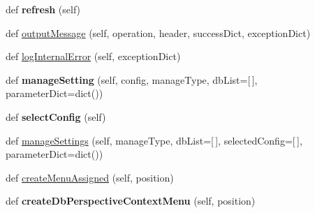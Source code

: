 \begin{DoxyCompactItemize}
def {\bfseries refresh} (self)
\item 
def \mbox{\hyperlink{class_dsg_tools_1_1_custom_widgets_1_1generic_manager_widget_1_1_generic_manager_widget_aef0d68dae266dd315aa07d964476108d}{output\+Message}} (self, operation, header, success\+Dict, exception\+Dict)
\item 
def \mbox{\hyperlink{class_dsg_tools_1_1_custom_widgets_1_1generic_manager_widget_1_1_generic_manager_widget_ae81b2d9956598304c8bf9e2a47e71a23}{log\+Internal\+Error}} (self, exception\+Dict)
\item 
\mbox{\label{class_dsg_tools_1_1_custom_widgets_1_1generic_manager_widget_1_1_generic_manager_widget_accb7b0f044f00120354953a48d13bda1}} 
def {\bfseries manage\+Setting} (self, config, manage\+Type, db\+List=\mbox{[}$\,$\mbox{]}, parameter\+Dict=dict())
\item 
\mbox{\label{class_dsg_tools_1_1_custom_widgets_1_1generic_manager_widget_1_1_generic_manager_widget_ae7d44fb3c4e97300ad8b2f99fbac58d7}} 
def {\bfseries select\+Config} (self)
\item 
def \mbox{\hyperlink{class_dsg_tools_1_1_custom_widgets_1_1generic_manager_widget_1_1_generic_manager_widget_af4b8531bd14c17c9089f310addfa2c4b}{manage\+Settings}} (self, manage\+Type, db\+List=\mbox{[}$\,$\mbox{]}, selected\+Config=\mbox{[}$\,$\mbox{]}, parameter\+Dict=dict())
\item 
def \mbox{\hyperlink{class_dsg_tools_1_1_custom_widgets_1_1generic_manager_widget_1_1_generic_manager_widget_a454e685df0db286bba28be75ab194e1f}{create\+Menu\+Assigned}} (self, position)
\item 
\mbox{\label{class_dsg_tools_1_1_custom_widgets_1_1generic_manager_widget_1_1_generic_manager_widget_a9fe565f3313b1fa81481208988e5f83c}} 
def {\bfseries create\+Db\+Perspective\+Context\+Menu} (self, position)
\item 
\mbox{\label{class_dsg_tools_1_1_custom_widgets_1_1generic_manager_widget_1_1_generic_manager_widget_a3123a34d34d742af6066e9e5e77c9ec2}} 

\end{DoxyCompactItemize}
